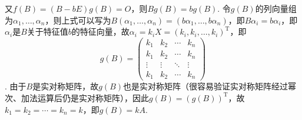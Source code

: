 \documentclass[12pt,fontset=fandol]{ctexart}
\begin{document}
\begin{solve}
\begin{enumerate}
                      又$f(B)=(B-bE)g(B)=O$，则$Bg(B)=bg(B)$. 令$g(B)$的列向量组为$\alpha_1,\ldots,\alpha_n$，则上式可以写为$B(\alpha_1,\ldots,\alpha_n)=(b\alpha_1,\ldots,b\alpha_n)$，即$B\alpha_i=b\alpha_i$，即$\alpha_i$是$B$关于特征值$b$的特征向量，故$\alpha_i=k_iX=(k_i,k_i,\ldots,k_i)^{\mathrm{T}}$，即
\[g(B)=\begin{pmatrix}
                              k_1 & k_2 & \cdots & k_n \\ k_1 & k_2 & \cdots & k_n \\ \vdots & \vdots & \ddots & \vdots \\ k_1 & k_2 & \cdots & k_n
                          \end{pmatrix}\]
. 由于$B$是实对称矩阵，故$g(B)$也是实对称矩阵（很容易验证实对称矩阵经过幂次、加法运算后仍是实对称矩阵），因此$g(B)=(g(B))^\mathrm{T}$，故$k_1=k_2=\cdots=k_n=k$，即$g(B)=kA$.
            \end{enumerate}
\end{solve}
\end{document}
